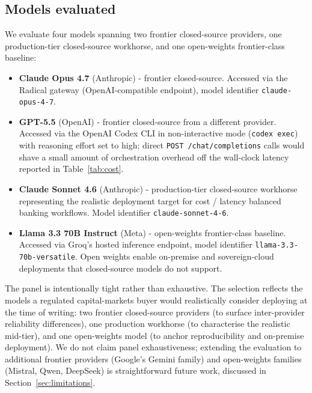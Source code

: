 \documentclass[11pt]{article}
\begin{document}
\subsection{Models evaluated}

We evaluate four models spanning two frontier closed-source providers, one production-tier closed-source workhorse, and one open-weights frontier-class baseline:

\begin{itemize}[leftmargin=*,itemsep=0.2em]
\item \textbf{Claude Opus 4.7} (Anthropic) - frontier closed-source. Accessed via the Radical gateway (OpenAI-compatible endpoint), model identifier \texttt{claude-opus-4-7}.
\item \textbf{GPT-5.5} (OpenAI) - frontier closed-source from a different provider. Accessed via the OpenAI Codex CLI in non-interactive mode (\texttt{codex exec}) with reasoning effort set to high; direct \texttt{POST /chat/completions} calls would shave a small amount of orchestration overhead off the wall-clock latency reported in Table~\ref{tab:cost}.
\item \textbf{Claude Sonnet 4.6} (Anthropic) - production-tier closed-source workhorse representing the realistic deployment target for cost / latency balanced banking workflows. Model identifier \texttt{claude-sonnet-4-6}.
\item \textbf{Llama 3.3 70B Instruct} (Meta) \citep{touvron2024llama3} - open-weights frontier-class baseline. Accessed via Groq's hosted inference endpoint, model identifier \texttt{llama-3.3-70b-versatile}. Open weights enable on-premise and sovereign-cloud deployments that closed-source models do not support.
\end{itemize}

The panel is intentionally tight rather than exhaustive. The selection reflects the models a regulated capital-markets buyer would realistically consider deploying at the time of writing: two frontier closed-source providers (to surface inter-provider reliability differences), one production workhorse (to characterise the realistic mid-tier), and one open-weights model (to anchor reproducibility and on-premise deployment). We do not claim panel exhaustiveness; extending the evaluation to additional frontier providers (Google's Gemini family) and open-weights families (Mistral, Qwen, DeepSeek) is straightforward future work, discussed in Section~\ref{sec:limitations}.
\end{document}
